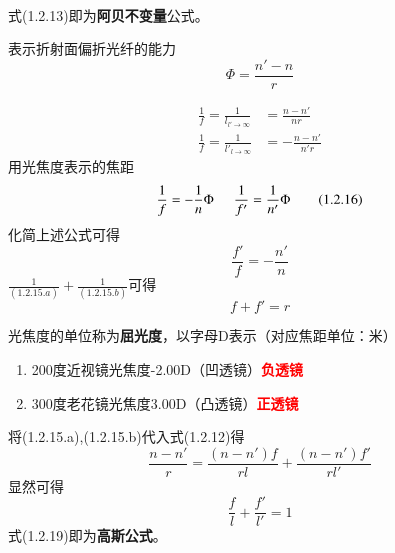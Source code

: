 \begin{description}[leftmargin=0.7cm,style=nextline,nosep]
\begin{align}
        \end{align}
        式(1.2.13)即为\textbf{阿贝不变量}公式。
    \item[光焦度]
        表示折射面偏折光纤的能力
        \begin{equation}
            \Phi=\frac{n'-n}{r}\tag{1.2.14}
        \end{equation}
    \item[焦距]
        \begin{align}
            \frac{1}{f}=\frac{1}{l_{l' \to \infty}} & =\frac{n-n'}{nr} \tag{1.2.15.a}   \\
            \frac{1}{f}=\frac{1}{l'_{l \to \infty}} & =-\frac{n-n'}{n'r} \tag{1.2.15.b}
        \end{align}
        用光焦度表示的焦距
        \begin{equation}
            \frac{1}{f}= -\frac{1}{n} \Phi\hspace{0.5cm}  \frac{1}{f'}=\frac{1}{n'}\Phi\tag{1.2.16}
        \end{equation}
        化简上述公式可得
        \begin{equation}
            \frac{f'}{f}=-\frac{n'}{n}\tag{1.2.17}
        \end{equation}
        $\displaystyle \frac{1}{(1.2.15.a)}+\frac{1}{(1.2.15.b)}$可得
        \begin{equation}
            f+f'=r\tag{1.2.18}
        \end{equation}
    \item[屈光度]
        光焦度的单位称为\textbf{屈光度}，以字母D表示（对应焦距单位：米）
        \begin{enumerate}[nosep]%
            \item  200度近视镜光焦度-2.00D（凹透镜）\textcolor{red}{\textbf{负透镜}}
            \item 300度老花镜光焦度3.00D（凸透镜）\textcolor{red}{\textbf{正透镜}}
        \end{enumerate}
    \item[高斯公式]
        将(1.2.15.a),(1.2.15.b)代入式(1.2.12)得
        \begin{equation}
            \frac{n-n'}{r}=\frac{(n-n')f}{rl}+\frac{(n-n')f'}{rl'}  \tag{1.2.19.bre1}
        \end{equation}
        显然可得
        \begin{equation}
            \frac{f}{l}+\frac{f'}{l'}=1 \tag{1.2.19}
        \end{equation}
        式(1.2.19)即为\textbf{高斯公式}。

\end{description}
